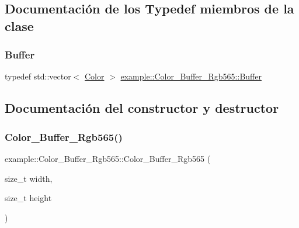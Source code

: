 \subsection{Documentación de los \textquotesingle{}Typedef\textquotesingle{} miembros de la clase}
\mbox{\label{classexample_1_1_color___buffer___rgb565_aa16ec2ed2344e9b45c7b11356aac455f}} 
\subsubsection{\texorpdfstring{Buffer}{Buffer}}
{\footnotesize\ttfamily typedef std\+::vector$<$ \mbox{\hyperlink{structexample_1_1_color___buffer___rgb565_1_1_color}{Color}} $>$ \mbox{\hyperlink{classexample_1_1_color___buffer___rgb565_aa16ec2ed2344e9b45c7b11356aac455f}{example\+::\+Color\+\_\+\+Buffer\+\_\+\+Rgb565\+::\+Buffer}}}



\subsection{Documentación del constructor y destructor}
\mbox{\label{classexample_1_1_color___buffer___rgb565_a06909e8edbc20bcfb6701b8d9b1ec311}} 
\subsubsection{\texorpdfstring{Color\_Buffer\_Rgb565()}{Color\_Buffer\_Rgb565()}}
{\footnotesize\ttfamily example\+::\+Color\+\_\+\+Buffer\+\_\+\+Rgb565\+::\+Color\+\_\+\+Buffer\+\_\+\+Rgb565 (\begin{DoxyParamCaption}\item[{size\+\_\+t}]{width,  }\item[{size\+\_\+t}]{height }\end{DoxyParamCaption})\hspace{0.3cm}{\ttfamily [inline]}}




